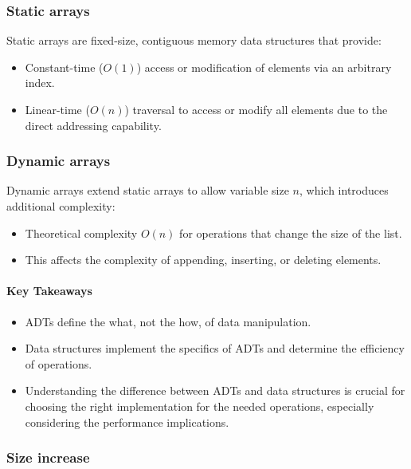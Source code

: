 \documentclass[12pt]{article}
\begin{document}
\subsubsection{Static arrays}
Static arrays are fixed-size, contiguous memory data structures that provide:

\begin{itemize}
    \item Constant-time (\(O(1)\)) access or modification of elements via an arbitrary index.
    \item Linear-time (\(O(n)\)) traversal to access or modify all elements due to the direct addressing capability.
\end{itemize}

\subsubsection{Dynamic arrays}
Dynamic arrays extend static arrays to allow variable size \( n \), which introduces additional complexity:

\begin{itemize}
    \item Theoretical complexity \( O(n) \) for operations that change the size of the list.
    \item This affects the complexity of appending, inserting, or deleting elements.
\end{itemize}

\paragraph{Key Takeaways}
\begin{itemize}
    \item ADTs define the what, not the how, of data manipulation.
    \item Data structures implement the specifics of ADTs and determine the efficiency of operations.
    \item Understanding the difference between ADTs and data structures is crucial for choosing the right implementation for the needed operations, especially considering the performance implications.
\end{itemize}

\subsubsection{Size increase}
\end{document}
